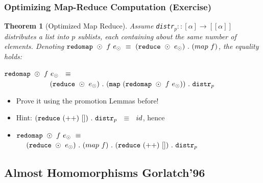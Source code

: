 \documentclass{beamer}
\renewcommand{\emph}[1]{\textcolor{structure}{#1}}
\newcommand{\emp}[1]{\textcolor{DikuRed}{ #1}}
\newtheorem{mytheo}{Theorem}
\begin{document}
\begin{frame}[fragile,t]
  \frametitle{Optimizing Map-Reduce Computation (\alert{Exercise})}

\begin{mytheo}[Optimized Map Reduce]\label{MapRed}
Assume {\tt distr$_p :: [\alpha] \rightarrow [[\alpha]]$}
distributes a list into $p$ sublists, each containing about 
the same number of elements. Denoting  
${\tt redomap }\ \odot \ f \ e_{\odot} \ \equiv \ ({\tt reduce} \ \odot \ e_{\odot}) \ . \ (map \ f)$, the equality holds:\\\bigskip

\emp{${\tt redomap} \ \odot \ f \ e_{\odot} \ \ \equiv$}\\
\emp{$\ \ \ \ \ \ \ \ \ \ \ \ \ \ \ \ \ \ \ ({\tt reduce} \ \odot \ e_{\odot}) \ . \ ({\tt map} \ ({\tt redomap} \ \odot \ f \ e_{\odot})) \ . \ {\tt distr}_p$}
\end{mytheo}

\begin{itemize}
    \item \alert{Prove it using the promotion Lemmas before!}
    \item \emph{Hint: $({\tt reduce} \ (++) \ []) \ . \ {\tt distr}_p \ \ \equiv \ \ id$, hence}
    \item \emph{${\tt redomap }\ \odot \ f \ e_{\odot} \ \equiv$\\ $\ \ \ \ ({\tt reduce} \ \odot \ e_{\odot}) \ . \ (map \ f) \ . \ ({\tt reduce} \ (++) \ []) \ . \ {\tt distr}_p$}
\end  {itemize}

\end{frame}

\subsection{Almost Homomorphisms Gorlatch'96}

\begin{frame}[fragile]
	\tableofcontents[currentsubsection]
\end{frame}
\end{document}
